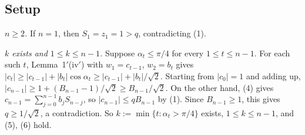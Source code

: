 \documentclass[11pt]{amsart}
\theoremstyle{remark}
\theoremstyle{plain}
\newcommand{\abs}[1]{\lvert #1\rvert}
\begin{document}
\subsection{Setup}\label{app:setup}
\emph{$n\ge2$.} If $n=1$, then $S_1=z_1=1>q$, contradicting (1).

\emph{$k$ exists and $1\le k\le n-1$.} Suppose $\alpha_t\le\pi/4$ for every $1\le t\le n-1$. For each such $t$, Lemma~1$'$(iv$'$) with $w_1=c_{t-1}$, $w_2=b_t$ gives $\abs{c_t}\ge\abs{c_{t-1}}+\abs{b_t}\cos\alpha_t\ge\abs{c_{t-1}}+\abs{b_t}/\sqrt2$. Starting from $\abs{c_0}=1$ and adding up, $\abs{c_{n-1}}\ge1+(B_{n-1}-1)/\sqrt2\ge B_{n-1}/\sqrt2$. On the other hand, (4) gives $c_{n-1}=\sum_{j=0}^{n-1}b_jS_{n-j}$, so $\abs{c_{n-1}}\le qB_{n-1}$ by (1). Since $B_{n-1}\ge1$, this gives $q\ge1/\sqrt2$, a contradiction. So $k:=\min\{t:\alpha_t>\pi/4\}$ exists, $1\le k\le n-1$, and (5), (6) hold.

\end{document}
